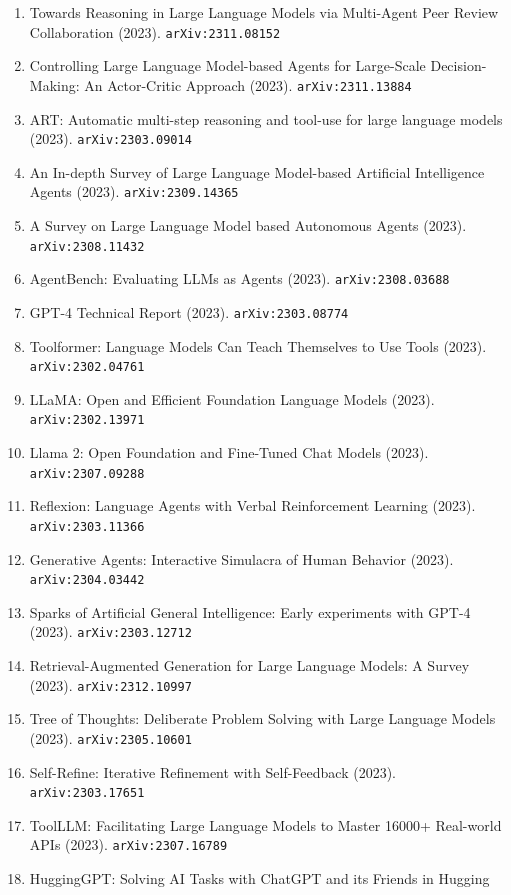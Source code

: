 \documentclass[11pt]{article}
\begin{document}
\begin{enumerate}
  \item Towards Reasoning in Large Language Models via Multi-Agent Peer Review
  Collaboration (2023). \texttt{arXiv:2311.08152}
  \item Controlling Large Language Model-based Agents for Large-Scale
  Decision-Making: An Actor-Critic Approach (2023). \texttt{arXiv:2311.13884}
  \item ART: Automatic multi-step reasoning and tool-use for large language
  models (2023). \texttt{arXiv:2303.09014}
  \item An In-depth Survey of Large Language Model-based Artificial Intelligence
  Agents (2023). \texttt{arXiv:2309.14365}
  \item A Survey on Large Language Model based Autonomous Agents (2023). \texttt{arXiv:2308.11432}
  \item AgentBench: Evaluating LLMs as Agents (2023). \texttt{arXiv:2308.03688}
  \item GPT-4 Technical Report (2023). \texttt{arXiv:2303.08774}
  \item Toolformer: Language Models Can Teach Themselves to Use Tools (2023). \texttt{arXiv:2302.04761}
  \item LLaMA: Open and Efficient Foundation Language Models (2023). \texttt{arXiv:2302.13971}
  \item Llama 2: Open Foundation and Fine-Tuned Chat Models (2023). \texttt{arXiv:2307.09288}
  \item Reflexion: Language Agents with Verbal Reinforcement Learning (2023). \texttt{arXiv:2303.11366}
  \item Generative Agents: Interactive Simulacra of Human Behavior (2023). \texttt{arXiv:2304.03442}
  \item Sparks of Artificial General Intelligence: Early experiments with GPT-4 (2023). \texttt{arXiv:2303.12712}
  \item Retrieval-Augmented Generation for Large Language Models: A Survey (2023). \texttt{arXiv:2312.10997}
  \item Tree of Thoughts: Deliberate Problem Solving with Large Language Models (2023). \texttt{arXiv:2305.10601}
  \item Self-Refine: Iterative Refinement with Self-Feedback (2023). \texttt{arXiv:2303.17651}
  \item ToolLLM: Facilitating Large Language Models to Master 16000+ Real-world
  APIs (2023). \texttt{arXiv:2307.16789}
  \item HuggingGPT: Solving AI Tasks with ChatGPT and its Friends in Hugging

\end{enumerate}
\end{document}
